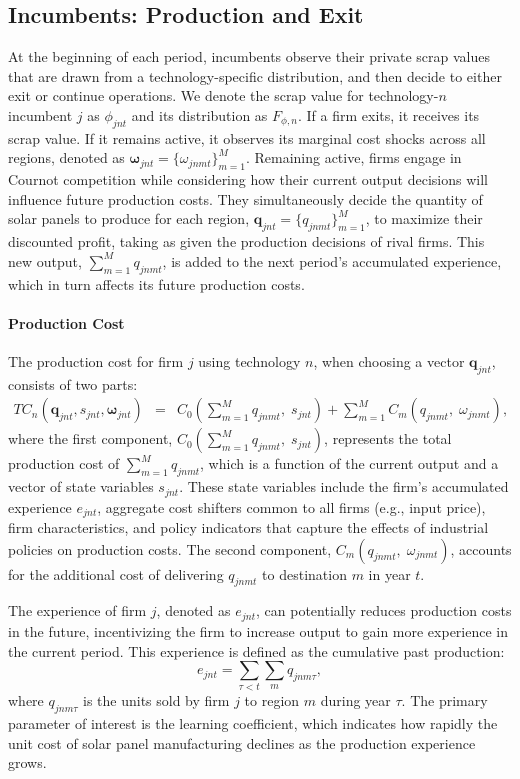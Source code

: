 \documentclass[12pt, letter]{article}
\begin{document}
\subsection{Incumbents: Production and Exit}
At the beginning of each period, incumbents observe their private scrap values that are drawn from a technology-specific distribution, and then decide to either exit or continue operations. We denote the scrap value for technology-$n$ incumbent $j$ as $\phi_{jnt}$ and its distribution as $F_{\phi,n}$. If a firm exits, it receives its scrap value. If it remains active, it observes its marginal cost shocks across all regions, denoted as $\mathbf{\omega}_{jnt} =\{\omega_{jnmt}\}_{m=1}^M$. Remaining active, firms engage in Cournot competition while considering how their current output decisions will influence future production costs. They simultaneously decide the quantity of solar panels to produce for each region, $\mathbf{q}_{jnt} = \{q_{jnmt}\}_{m=1}^M$, to maximize their discounted profit, taking as given the production decisions of rival firms. This new output, $\sum_{m=1}^M q_{jnmt}$, is added to the next period's accumulated experience, which in turn affects its future production costs.

\paragraph{Production Cost}
The production cost for firm $j$ using technology $n$, when choosing a vector $\mathbf{q}_{jnt}$, consists of two parts:
\begin{eqnarray}
   TC_{n}(\mathbf{q}_{jnt},s_{jnt},\mathbf{\omega}_{jnt})&=& C_0\!\left(\sum_{m=1}^M q_{jnmt},\; s_{jnt}\right) + \sum_{m=1}^M C_m\!\left(q_{jnmt},\; \omega_{jnmt}\right) \label{eq:model_c_q},
\end{eqnarray}
where the first component, $C_0\!\left(\sum_{m=1}^M q_{jnmt},\; s_{jnt}\right)$, represents the total production cost of $\sum_{m=1}^M q_{jnmt}$, which is a function of the current output and a vector of state variables $s_{jnt}$. These state variables include the firm's accumulated experience $e_{jnt}$, aggregate cost shifters common to all firms (e.g., input price), firm characteristics, and policy indicators that capture the effects of industrial policies on production costs. The second component, $C_m\!\left(q_{jnmt},\; \omega_{jnmt}\right)$, accounts for the additional cost of delivering $q_{jnmt}$ to destination $m$ in year $t$.

The experience of firm $j$, denoted as $e_{jnt}$, can potentially reduces production costs in the future, incentivizing the firm to increase output to gain more experience in the current period.  This experience is defined as the cumulative past production:
\[e_{jnt} = \sum_{\tau<t} \sum_m q_{jnm\tau},\]
where $q_{jnm\tau}$ is the units sold by firm $j$ to region $m$ during year $\tau$. The primary parameter of interest is the learning coefficient, which indicates how rapidly the unit cost of solar panel manufacturing declines as the production experience grows. 
\end{document}
